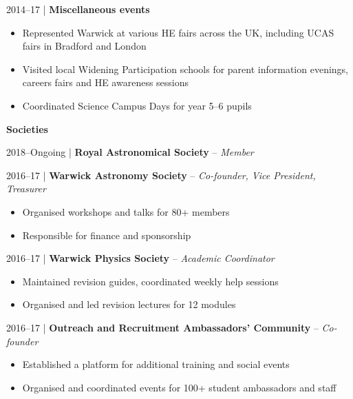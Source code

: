 \documentclass[10pt,a4paper]{altacv}
\begin{document}
\smallskip

\small 2014--17 | \textbf{Miscellaneous events} \\
\smallskip
\begin{itemize}
	\item Represented Warwick at various HE fairs across the UK, including UCAS fairs in Bradford and London
	\item Visited local Widening Participation schools for parent information evenings, careers fairs and HE awareness sessions
	\item Coordinated Science Campus Days for year 5--6 pupils
\end{itemize}

\divider

\normalsize \textbf{Societies}

\medskip


\small 2018--Ongoing | \textbf{Royal Astronomical Society} -- \textit{Member} \\

\smallskip

\small 2016--17 | \textbf{Warwick Astronomy Society} -- \textit{Co-founder, Vice President, Treasurer} \\
\smallskip
\begin{itemize}
	\item Organised workshops and talks for 80+ members
	\item Responsible for finance and sponsorship
\end{itemize}

\smallskip

\small 2016--17 | \textbf{Warwick Physics Society} -- \textit{Academic Coordinator} \\
\smallskip
\begin{itemize}
	\item Maintained revision guides, coordinated weekly help sessions
	\item Organised and led revision lectures for 12 modules
\end{itemize}

\smallskip

\small 2016--17 | \textbf{Outreach and Recruitment Ambassadors' Community} -- \textit{Co-founder} \\
\smallskip
\begin{itemize}
	\item Established a platform for additional training and social events
	\item Organised and coordinated events for 100+ student ambassadors and staff
\end{itemize}
\end{document}
